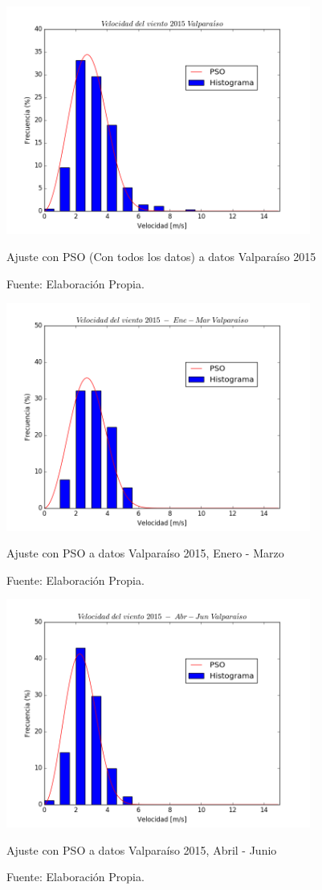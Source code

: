\begin{figure}[h!]
    \centering
    \includegraphics[height=75mm]{figures/result_2015_fit_all_data.png}
    \caption{Ajuste con PSO (Con todos los datos) a datos Valparaíso 2015}
    \vspace{-.25cm}
    \caption*{Fuente: Elaboración Propia.}
    \label{fig:pso_valpo_15_all_data}
\end{figure}
\begin{figure}[h!]
    \centering
    \includegraphics[height=75mm]{figures/result_2015_Ene-Mar.png}
    \caption{Ajuste con PSO a datos Valparaíso 2015, Enero - Marzo}
    \vspace{-.25cm}
    \caption*{Fuente: Elaboración Propia.}
    \label{fig:pso_valpo_15_ene_mar}
\end{figure}
\begin{figure}[h!]
    \centering
    \includegraphics[height=75mm]{figures/result_2015_Abr-Jun.png}
    \caption{Ajuste con PSO a datos Valparaíso 2015, Abril - Junio}
    \vspace{-.25cm}
    \caption*{Fuente: Elaboración Propia.}
    \label{fig:pso_valpo_15_abr_jun}
\end{figure}
